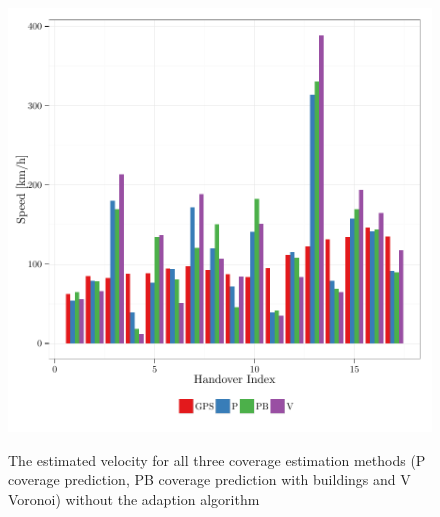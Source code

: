 	\begin{figure}[h!]
		
		\caption{ The estimated velocity for all three coverage estimation methods (P coverage prediction, PB coverage prediction with buildings and V Voronoi) without the adaption algorithm
		}
		\includegraphics[width=0.9\columnwidth]{images/563_SpeedWithoutAdaption}
		\label{fig:velocity}
	\end{figure}

